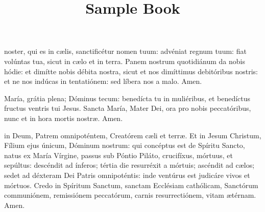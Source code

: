 \documentclass[10pt,twoside,final,a5paper]{memoir}
\title{Sample Book}
\begin{document}


\frontmatter

\mainmatter











 noster, qui es in cælis, sanctificétur nomen tuum: advéniat regnum tuum: fiat volúntas tua, sicut in cælo et in terra. Panem nostrum quotidiánum da nobis hódie: et dimítte nobis débita nostra, sicut et nos dimíttimus debitóribus nostris: et ne nos indúcas in tentatiónem: sed líbera nos a malo. Amen.

 María, grátia plena; Dóminus tecum: benedícta tu in muliéribus, et benedíctus fructus ventris tui Jesus. Sancta María, Mater Dei, ora pro nobis peccatóribus, nunc et in hora mortis nostræ. Amen.

 in Deum, Patrem omnipoténtem, Creatórem cæli et terræ. Et in Jesum Christum, Fílium ejus únicum, Dóminum nostrum: qui concéptus est de Spíritu Sancto, natus ex María Vírgine, passus sub Póntio Piláto, crucifíxus, mórtuus, et sepúltus: descéndit ad ínferos; tértia die resurréxit a mórtuis; ascéndit ad cælos; sedet ad déxteram Dei Patris omnipoténtis: inde ventúrus est judicáre vivos et mórtuos. Credo in Spíritum Sanctum, sanctam Ecclésiam cathólicam, Sanctórum communiónem, remissiónem peccatórum, carnis resurrectiónem, vitam ætérnam. Amen.


\gloriapatri

\separator




\end{document}
